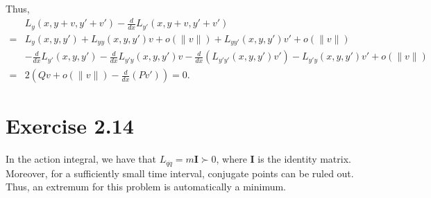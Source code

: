 \documentclass[11pt]{report}
\begin{document}
Thus, 
\begin{align*}
& L_y(x, y+v, y'+v') - \frac{d}{dx} L_{y'}(x, y+v, y'+v') \\
= & L_y(x, y, y') + L_{yy}(x,y,y')v + o(\|v\|) + L_{yy'}(x,y,y')v' + o(\|v\|)\\
&- \frac{d}{dx}L_{y'}(x,y,y') - \frac{d}{dx}L_{y'y}(x,y,y')v - \frac{d}{dx}\left(L_{y'y'}(x,y,y')v'\right) - L_{y'y}(x,y,y')v' + o(\|v\|)\\
= & 2\left(Qv + o(\|v\|) - \frac{d}{dx}(Pv')\right) = 0.
\end{align*}


\section*{Exercise 2.14}
In the action integral, we have that $L_{\dot{q}\dot{q}} = m \mathbf{I} \succ 0$, where $\mathbf{I}$ is the identity matrix. Moreover, for a sufficiently small time interval, conjugate points can be ruled out. Thus, an extremum for this problem is automatically a minimum.
\end{document}

